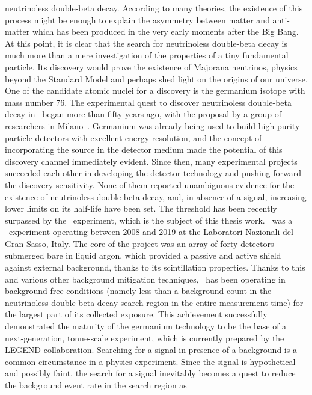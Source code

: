 neutrinoless double-beta decay. According to many theories, the existence of this process
might be enough to explain the asymmetry between matter and anti-matter which has been
produced in the very early moments after the Big Bang. At this point, it is clear that
the search for neutrinoless double-beta decay is much more than a mere investigation of
the properties of a tiny fundamental particle. Its discovery would prove the existence of
Majorana neutrinos, physics beyond the Standard Model and perhaps shed light on the
origins of our universe.
\newpar
One of the candidate atomic nuclei for a discovery is the germanium isotope with mass
number 76. The experimental quest to discover neutrinoless double-beta decay in \gesix\
began more than fifty years ago, with the proposal by a group of researchers in
Milano~\cite{Fiorini1967}.  Germanium was already being used to build high-purity particle
detectors with excellent energy resolution, and the concept of incorporating the source in
the detector medium made the potential of this discovery channel immediately evident.
Since then, many experimental projects succeeded each other in developing the detector
technology and pushing forward the discovery sensitivity. None of them reported
unambiguous evidence for the existence of neutrinoless double-beta decay, and, in absence
of a signal, increasing lower limits on its half-life have been set. The \powtenyr{26}
threshold has been recently surpassed by the \gerda\ experiment, which is the subject of
this thesis work. \gerda\ was a \gesix\ experiment operating between 2008 and 2019 at the
Laboratori Nazionali del Gran Sasso, Italy. The core of the project was an array of forty
detectors submerged bare in liquid argon, which provided a passive and active shield
against external background, thanks to its scintillation properties. Thanks to this and
various other background mitigation techniques, \gerda\ has been operating in
background-free conditions (namely less than a background count in the neutrinoless
double-beta decay search region in the entire measurement time) for the largest part of
its collected exposure. This achievement successfully demonstrated the maturity of the
germanium technology to be the base of a next-generation, tonne-scale experiment, which is
currently prepared by the LEGEND collaboration.
\newpar
Searching for a signal in presence of a background is a common circumstance in a physics
experiment. Since the signal is hypothetical and possibly faint, the search for a signal
inevitably becomes a quest to reduce the background event rate in the search region as
